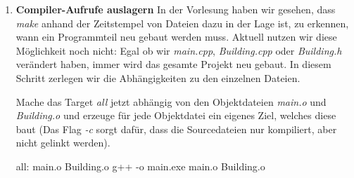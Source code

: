 \begin{enumerate}
\begin{minipage}[t]{.45\textwidth}
\begin{lstlisting}
/*
* File: Building.h
*/
#ifndef BUILDING_H_
#define BUILDING_H_

#include <string>

class Building {
public:
    Building(unsigned int numFloors);
    const std::string toString() const;
private:
    unsigned int numFloors;
};
#endif
\end{lstlisting}
\end{minipage}
\begin{minipage}[t]{.45\textwidth}
\begin{lstlisting}
/*
* File: Building.cpp
*/
#include "Building.h"

#include <string>
#include <sstream>

using namespace std;

Building::Building(unsigned int numFloors) :
    numFloors(numFloors) {}

const std::string Building::toString() const{
    stringstream output;
    output << "A building with " 
           << this->numFloors 
           << " floors\n";
    return output.str();
}
\end{lstlisting}
\end{minipage}

Erzeuge in \emph{main} eine zweistöckige Instanz von \emph{Building} und gib diese mittels \emph{Building::toString} auf der Konsole aus.

Damit das Projekt kompiliert, muss auch \emph{Building} im Makefile eingetragen werden.
Passe dazu den Compileraufruf an:
\begin{lstmake}
all:
    g++ -o main.exe main.cpp Building.cpp
\end{lstmake}

Wenn du das Projekt gebaut hast, sollte auf der Konsole eine Ausgabe deines Gebäudes erscheinen.

\item\textbf{Compiler-Aufrufe auslagern}
In der Vorlesung haben wir gesehen, dass \emph{make} anhand der Zeitstempel von Dateien dazu in der Lage ist, zu erkennen, wann ein Programmteil neu gebaut werden muss.
Aktuell nutzen wir diese Möglichkeit noch nicht:
Egal ob wir \emph{main.cpp}, \emph{Building.cpp} oder \emph{Building.h} verändert haben, immer wird das gesamte Projekt neu gebaut.
In diesem Schritt zerlegen wir die Abhängigkeiten zu den einzelnen Dateien.

Mache das Target \emph{all} jetzt abhängig von den Objektdateien \emph{main.o} und \emph{Building.o} und erzeuge für jede Objektdatei ein eigenes Ziel, welches diese baut (Das Flag \emph{-c} sorgt dafür, dass die Sourcedateien nur kompiliert, aber nicht gelinkt werden).
\begin{lstmake}
all: main.o Building.o
	g++ -o main.exe main.o Building.o


\end{lstmake}
\end{enumerate}
